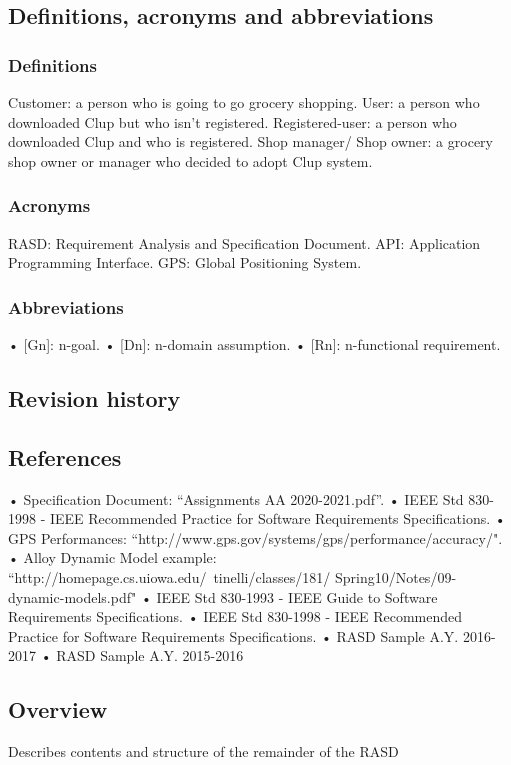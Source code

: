 \subsection{Definitions, acronyms and abbreviations}
\label{subsect:definitionsacronymsabbreviations}

\subsubsection{Definitions}
\label{subsect:definitions}
Customer: a person who is going to go grocery shopping.
User: a person who downloaded Clup but who isn't registered.
Registered-user: a person who downloaded Clup and who is registered.
Shop manager/ Shop owner: a grocery shop owner or manager who decided to adopt Clup system.

\subsubsection{Acronyms}
\label{subsect:acronyms}
RASD: Requirement Analysis and Specification Document.
API: Application Programming Interface.
GPS: Global Positioning System.

\subsubsection{Abbreviations}
\label{subsect:abbreviations}
• [Gn]: n-goal.
• [Dn]: n-domain assumption.
• [Rn]: n-functional requirement.


\subsection{Revision history}
\label{subsect:revisionhistory}

\subsection{References}
\label{subsect:references}
• Specification Document: “Assignments AA 2020-2021.pdf”.
• IEEE Std 830-1998 - IEEE Recommended Practice for Software Requirements Specifications.
• GPS Performances: “http://www.gps.gov/systems/gps/performance/accuracy/".
• Alloy Dynamic Model example: “http://homepage.cs.uiowa.edu/~tinelli/classes/181/
Spring10/Notes/09-dynamic-models.pdf"
• IEEE Std 830-1993 - IEEE Guide to Software Requirements Specifications.
• IEEE Std 830-1998 - IEEE Recommended Practice for Software Requirements Specifications.
• RASD Sample A.Y. 2016-2017
• RASD Sample A.Y. 2015-2016


\subsection{Overview}
\label{subsect:overview}

Describes contents and structure of the remainder of the RASD